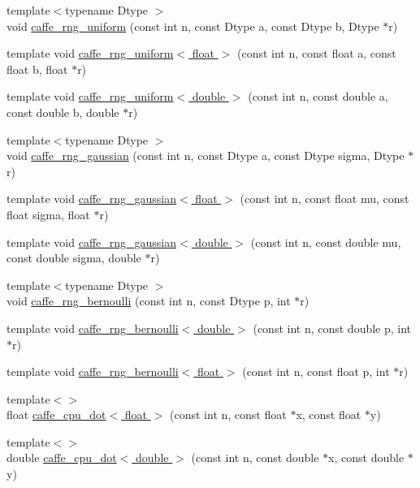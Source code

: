 \begin{DoxyCompactItemize}
\item 
{\footnotesize template$<$typename Dtype $>$ }\\void \hyperlink{namespacecaffe_aaa5652f7a969f004b364af65a7fa12c4}{caffe\+\_\+rng\+\_\+uniform} (const int n, const Dtype a, const Dtype b, Dtype $\ast$r)
\item 
template void \hyperlink{namespacecaffe_a847ecc499532e6db9ad63f3c6bc12bfb}{caffe\+\_\+rng\+\_\+uniform$<$ float $>$} (const int n, const float a, const float b, float $\ast$r)
\item 
template void \hyperlink{namespacecaffe_a8c4bdf8dedd6900827a2786a51fc51ff}{caffe\+\_\+rng\+\_\+uniform$<$ double $>$} (const int n, const double a, const double b, double $\ast$r)
\item 
{\footnotesize template$<$typename Dtype $>$ }\\void \hyperlink{namespacecaffe_a234ba884463ab0c35b9398c6daab00d3}{caffe\+\_\+rng\+\_\+gaussian} (const int n, const Dtype a, const Dtype sigma, Dtype $\ast$r)
\item 
template void \hyperlink{namespacecaffe_a651fc6ba95e1d724fb83944da736b72f}{caffe\+\_\+rng\+\_\+gaussian$<$ float $>$} (const int n, const float mu, const float sigma, float $\ast$r)
\item 
template void \hyperlink{namespacecaffe_a1d49416846c39cc87283957ee159d7a9}{caffe\+\_\+rng\+\_\+gaussian$<$ double $>$} (const int n, const double mu, const double sigma, double $\ast$r)
\item 
{\footnotesize template$<$typename Dtype $>$ }\\void \hyperlink{namespacecaffe_af11e588b9a477a4ba11118f17de6874d}{caffe\+\_\+rng\+\_\+bernoulli} (const int n, const Dtype p, int $\ast$r)
\item 
template void \hyperlink{namespacecaffe_aa4918edaa352d82ee01343ee08c96797}{caffe\+\_\+rng\+\_\+bernoulli$<$ double $>$} (const int n, const double p, int $\ast$r)
\item 
template void \hyperlink{namespacecaffe_a4e8207b9eb53532b11e1b8759f9621fe}{caffe\+\_\+rng\+\_\+bernoulli$<$ float $>$} (const int n, const float p, int $\ast$r)
\item 
{\footnotesize template$<$$>$ }\\float \hyperlink{namespacecaffe_a12d45dfd2319449235d948bd78a7bc6b}{caffe\+\_\+cpu\+\_\+dot$<$ float $>$} (const int n, const float $\ast$x, const float $\ast$y)
\item 
{\footnotesize template$<$$>$ }\\double \hyperlink{namespacecaffe_a423a59360efc1a6f23710a5d914d9b84}{caffe\+\_\+cpu\+\_\+dot$<$ double $>$} (const int n, const double $\ast$x, const double $\ast$y)

\end{DoxyCompactItemize}
